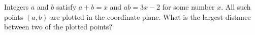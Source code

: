Integers $a$ and $b$ satisfy $a+b=x$ and $ab=3x-2$ for some number $x$. All such points $(a,b)$ are plotted in the coordinate plane. What is the largest distance between two of the plotted points?
